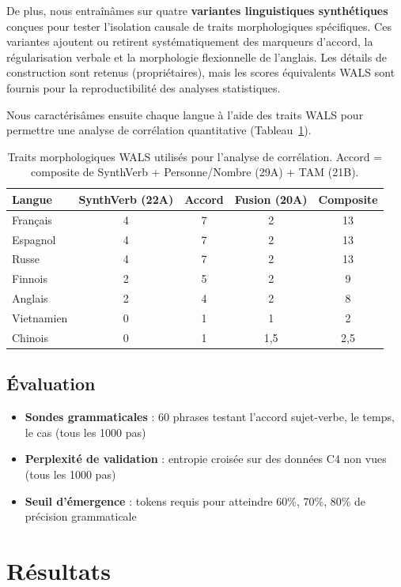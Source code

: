 \documentclass[11pt]{article}
\begin{document}
De plus, nous entraînâmes sur quatre \textbf{variantes linguistiques synthétiques} conçues pour tester l'isolation causale de traits morphologiques spécifiques. Ces variantes ajoutent ou retirent systématiquement des marqueurs d'accord, la régularisation verbale et la morphologie flexionnelle de l'anglais. Les détails de construction sont retenus (propriétaires), mais les scores équivalents WALS sont fournis pour la reproductibilité des analyses statistiques.

Nous caractérisâmes ensuite chaque langue à l'aide des traits WALS pour permettre une analyse de corrélation quantitative (Tableau~\ref{tab:wals-fr}).

\begin{table}[h]
\centering
\begin{tabular}{lcccc}
\toprule
Langue & SynthVerb (22A) & Accord & Fusion (20A) & Composite \\
\midrule
Français & 4 & 7 & 2 & 13 \\
Espagnol & 4 & 7 & 2 & 13 \\
Russe & 4 & 7 & 2 & 13 \\
Finnois & 2 & 5 & 2 & 9 \\
Anglais & 2 & 4 & 2 & 8 \\
Vietnamien & 0 & 1 & 1 & 2 \\
Chinois & 0 & 1 & 1,5 & 2,5 \\
\bottomrule
\end{tabular}
\caption{Traits morphologiques WALS utilisés pour l'analyse de corrélation. Accord = composite de SynthVerb + Personne/Nombre (29A) + TAM (21B).}
\label{tab:wals-fr}
\end{table}

\subsection{Évaluation}

\begin{itemize}
    \item \textbf{Sondes grammaticales} : 60 phrases testant l'accord sujet-verbe, le temps, le cas (tous les 1000 pas)
    \item \textbf{Perplexité de validation} : entropie croisée sur des données C4 non vues (tous les 1000 pas)
    \item \textbf{Seuil d'émergence} : tokens requis pour atteindre 60\%, 70\%, 80\% de précision grammaticale
\end{itemize}

\section{Résultats}
\end{document}
